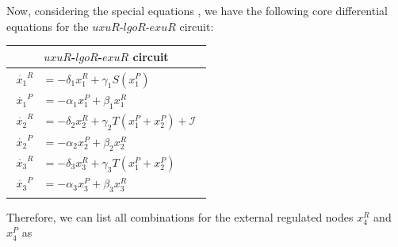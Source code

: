 Now, considering the special equations \cite{stochs_gene_2005}, 
we have the following core differential equations for 
the $uxuR$-$lgoR$-$exuR$ circuit:

{
    \setlength{\tabcolsep}{12pt}
    \renewcommand{\arraystretch}{4.5}
\begin{table}[H]
    \centering
    \vspace{0.2cm}
    \hspace{-0.6cm}
    \begin{tabular}{|c|}
        \hline
        \textbf{$uxuR$-$lgoR$-$exuR$ circuit} \\
        \hline
        $\begin{aligned}
            \dot{x_1}^R &= -\delta_1 x_1^R + \gamma_1S(x_1^P)\\
            \dot{x_1}^P &= -\alpha_1 x_1^P + \beta_1 x_1^R\\
            \dot{x_2}^R &= -\delta_2 x_2^R + \gamma_2T(x_1^P+x_2^P) + \mathcal{I}\\
            \dot{x_2}^P &= -\alpha_2 x_2^P + \beta_2 x_2^R\\
            \dot{x_3}^R &= -\delta_3 x_3^R + \gamma_3T(x_1^P+x_2^P) \\
            \dot{x_3}^P &= -\alpha_3 x_3^P + \beta_3 x_3^R
        \end{aligned}$  \\[1.250cm]
        \hline

    \end{tabular}
\end{table}
}

Therefore, we can list all combinations for the external 
regulated nodes $x_4^R$ and $x_4^P$ as 

